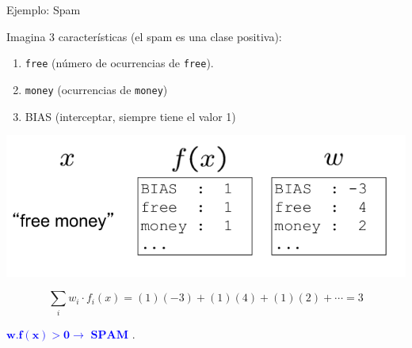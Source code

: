 \documentclass[11pt]{beamer}
\begin{document}
\begin{frame}{Ejemplo: Spam}
\small{Imagina 3 caracter\'isticas (el spam es una clase positiva):
\begin{enumerate}
	\item \texttt{free} (n\'umero de ocurrencias de \texttt{free}).
	\item \texttt{money} (ocurrencias de \texttt{money})
	\item BIAS (interceptar, siempre tiene el valor 1)
\end{enumerate}

	\includegraphics[scale= 0.28]{TA11.png}
	
\[
\sum_{i}w_i\cdot f_i(x) = (1)(-3) + (1)(4) + (1)(2) + \cdots = 3
\]
}


\qquad \Large{\textcolor{blue}{$\mathbf{w. f(x) > 0} \rightarrow  \textbf{ SPAM}$ }}.

\end{frame}
\end{document}
